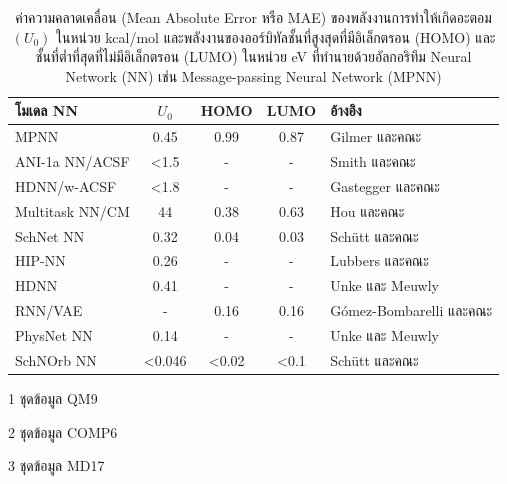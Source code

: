 \begin{table}[H]
    \begin{threeparttable}[b]
    \centering
    \caption{ค่าความคลาดเคลื่อน (Mean Absolute Error หรือ MAE) ของพลังงานการทำให้เกิดอะตอม $(U_{0})$ ในหน่วย kcal/mol 
    และพลังงานของออร์บิทัลชั้นที่สูงสุดที่มีอิเล็กตรอน (HOMO) และชั้นที่ต่ำที่สุดที่ไม่มีอิเล็กตรอน (LUMO) ในหน่วย eV ที่ทำนายด้วยอัลกอริทึม 
    Neural Network (NN) เช่น Message-passing Neural Network (MPNN)}
    \label{tab:pred_ener_atom_orb_nn}
    \begin{tabular}{lcccl}
    \toprule
    \textbf{โมเดล NN} &\textbf{$U_{0}$} &HOMO &LUMO &\textbf{อ้างอิง} \\
    \midrule
    MPNN\tnote{1} &0.45 &0.99 &0.87 &Gilmer และคณะ\autocite{gilmer2017} \\
    ANI-1a NN/ACSF\tnote{2} &<1.5 &- &- &Smith และคณะ\autocite{smith2017,smith2018,smith2019} \\
    HDNN/w-ACSF\tnote{1} &<1.8 &- &- &Gastegger และคณะ\autocite{gastegger2018} \\
    Multitask NN/CM\tnote{1} &44 &0.38 &0.63 &Hou และคณะ\autocite{hou2018} \\
    SchNet NN\tnote{1} &0.32 &0.04 &0.03 &Schütt และคณะ\autocite{schutt2018} \\
    HIP-NN\tnote{1} &0.26 &- &- &Lubbers และคณะ\autocite{lubbers2018} \\
    HDNN\tnote{1} &0.41 &- &- &Unke และ Meuwly\autocite{unke2018} \\
    RNN/VAE\tnote{1} &- &0.16 &0.16 &G\'{o}mez-Bombarelli และคณะ\autocite{gomez-bombarelli2018} \\
    PhysNet NN\tnote{1} &0.14 &- &- &Unke และ Meuwly\autocite{unke2019} \\
    SchNOrb NN\tnote{3} &<0.046 &<0.02 &<0.1 &Sch\"{u}tt และคณะ\autocite{schutt2019a} \\
    \bottomrule
    \end{tabular}
    \begin{tablenotes}
        \item [1]ชุดข้อมูล QM9
        \item [2]ชุดข้อมูล COMP6
        \item [3]ชุดข้อมูล MD17
      \end{tablenotes}
    \end{threeparttable}
\end{table}

\autocite{pereira2017,stuke2019,chang2019,rahaman2020,moore2022,ye2022}

